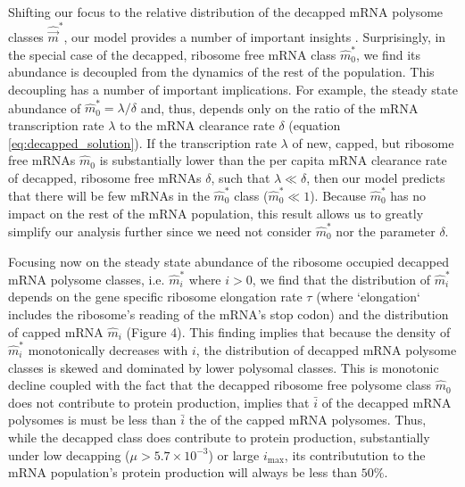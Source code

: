 \documentclass[a4,center,fleqn]{NAR}
\newcommand{\imax}{\ensuremath{{i_{\max}}}\xspace}
\newcommand{\mhat}{\ensuremath{\hat{m}}\xspace}
\newcommand{\mvec}{\ensuremath{\vec{m}}\xspace}
\newcommand{\mvechat}{\ensuremath{\hat{\mvec}}\xspace}
\newcommand{\mvechatstar}{\ensuremath{\mvechat^*}\xspace}
\newcommand{\MRL}{\ensuremath{\bar{i}}\xspace}
\begin{document}
Shifting our focus to the relative distribution of the decapped mRNA polysome classes \mvechatstar, our model provides a number of important insights .
Surprisingly, in the special case of the decapped, ribosome free mRNA class $\mhat_0^*$, we find its abundance is decoupled from the dynamics of the rest of the population.
  This decoupling has a number of important implications.
  For example, the steady state abundance of $\mhat_0^* = \lambda/\delta$ and, thus, depends only on the ratio of the mRNA transcription rate $\lambda$ to the mRNA clearance rate $\delta$ (equation \ref{eq:decapped_solution}).
  If the transcription rate $\lambda$ of new, capped, but ribosome free mRNAs $\mhat_0$ is substantially lower than the per capita mRNA clearance rate of decapped, ribosome free mRNAs $\delta$, such that  $\lambda \ll \delta$, then our model predicts that there will be few mRNAs in the $\mhat_0^*$ class ($\mhat_0^* \ll 1$).
  Because $\mhat^*_0$ has no impact on the rest of the mRNA population, this result allows us to greatly simplify our analysis further since we need not consider $\mhat_0^*$ nor the parameter $\delta$.

Focusing now on the steady state abundance of the ribosome occupied decapped mRNA polysome classes, i.e.  $\mhat_i^*$ where $i > 0$, we find that the distribution of $\mhat^*_i$  depends on the gene specific ribosome elongation rate $\tau$ (where `elongation`  includes the ribosome's reading of the mRNA's stop codon) and the distribution of capped mRNA $\mhat_i$ (Figure 4).
\label{item:protein_production} This finding implies that because the density of $\mhat^*_i$ monotonically decreases with $i$, the distribution of decapped mRNA polysome classes is skewed and dominated by lower polysomal classes.
  This is monotonic decline coupled with the fact that the decapped ribosome free polysome class $\mhat_0$ does not contribute to protein production, implies that \MRL of the decapped mRNA polysomes is must be less than \MRL the of the capped mRNA polysomes.
  Thus, while the decapped class does contribute to protein production, substantially under low decapping ($\mu> 5.7 \times 10^{-3}$) or large \imax, its contributution to the mRNA population's protein production will always be less than  $50\%$.
\end{document}
